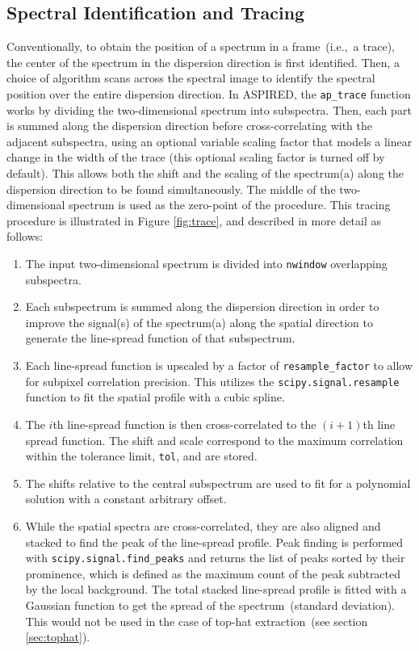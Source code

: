 \documentclass[linenumbers, twocolumn]{aastex631}
\begin{document}
\subsection{Spectral Identification and Tracing}
\label{sec:tracing}
Conventionally, to obtain the position of a spectrum in a frame~(i.e.,\ a trace),
the center of the spectrum in the dispersion direction is first identified. Then,
a choice of algorithm scans across the spectral image to identify
the spectral position over the entire dispersion direction. In \textsc{ASPIRED},
the \texttt{ap\_trace} function works by dividing the two-dimensional spectrum
into subspectra. Then, each part is summed along the dispersion direction
before cross-correlating with the adjacent subspectra, using an optional variable
scaling factor that models a linear change in the width of the trace (this
optional scaling factor is turned off by default). This allows both the shift and the scaling of
the spectrum(a) along the dispersion direction to be found simultaneously. The
middle of the two-dimensional spectrum is used as the zero-point of the
procedure. This tracing procedure is illustrated in Figure \ref{fig:trace},
and described in more detail as follows:
\begin{enumerate}
    \item
        The input two-dimensional spectrum is divided into \texttt{nwindow}
        overlapping subspectra.
    \item
        Each subspectrum is summed along the dispersion direction
        in order to improve the signal(s) of the spectrum(a) along
        the spatial direction to generate the line-spread function
        of that subspectrum.
    \item
        Each line-spread function is upscaled by a factor of
        \texttt{resample\_factor} to allow for subpixel correlation
        precision. This utilizes the \texttt{scipy.signal.resample}
        function to fit the spatial profile with a cubic spline.
    \item
        The $i$th line-spread function is then cross-correlated to the $(i+1)$th
        line spread function. The shift and scale correspond to the maximum
        correlation within the tolerance limit, \texttt{tol}, and are stored.
    \item
        The shifts relative to the central subspectrum are used to
        fit for a polynomial solution with a constant arbitrary offset.
    \item
        While the spatial spectra are cross-correlated, they are also
        aligned and stacked to find the peak of the line-spread profile.
        Peak finding is performed with \texttt{scipy.signal.find\_peaks}
        and returns the list of peaks sorted by their prominence, which is
        defined as the maximum count of the peak subtracted by the local
        background. The total stacked line-spread profile is fitted with
        a Gaussian function to get the spread of the spectrum~(standard
        deviation). This would not be used in the case of top-hat
        extraction~(see section \textsection\ref{sec:tophat}).
\end{enumerate}
\end{document}
